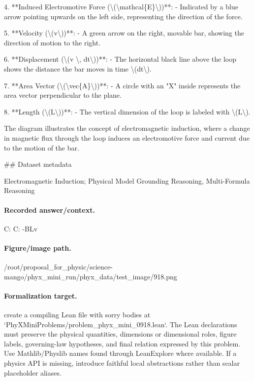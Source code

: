 4. **Induced Electromotive Force (\textbackslash{}(\textbackslash{}mathcal\{E\}\textbackslash{}))**:
   - Indicated by a blue arrow pointing upwards on the left side, representing the direction of the force.

5. **Velocity (\textbackslash{}(v\textbackslash{}))**:
   - A green arrow on the right, movable bar, showing the direction of motion to the right.

6. **Displacement (\textbackslash{}(v \textbackslash{}, dt\textbackslash{}))**:
   - The horizontal black line above the loop shows the distance the bar moves in time \textbackslash{}(dt\textbackslash{}).

7. **Area Vector (\textbackslash{}(\textbackslash{}vec\{A\}\textbackslash{}))**:
   - A circle with an "X" inside represents the area vector perpendicular to the plane.

8. **Length (\textbackslash{}(L\textbackslash{}))**:
   - The vertical dimension of the loop is labeled with \textbackslash{}(L\textbackslash{}).

The diagram illustrates the concept of electromagnetic induction, where a change in magnetic flux through the loop induces an electromotive force and current due to the motion of the bar.

\#\# Dataset metadata

Electromagnetic Induction; Physical Model Grounding Reasoning, Multi-Formula Reasoning

\paragraph{Recorded answer/context.}
C: C: -BLv

\paragraph{Figure/image path.}
/root/proposal\_for\_physic/science-mango/phyx\_mini\_run/phyx\_data/test\_image/918.png

\paragraph{Formalization target.}
create a compiling Lean file with sorry bodies at `PhyXMiniProblems/problem\_phyx\_mini\_0918.lean`. The Lean declarations must preserve the physical quantities, dimensions or dimensional roles, figure labels, governing-law hypotheses, and final relation expressed by this problem.
Use Mathlib/Physlib names found through LeanExplore where available. If a physics API is missing, introduce faithful local abstractions rather than scalar placeholder aliases.

